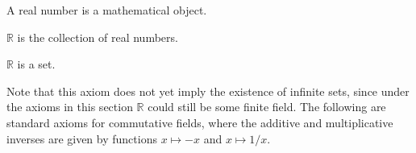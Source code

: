 \documentclass{article}
\begin{document}
\begin{forthel}

\begin{signature}
A real number is a mathematical object.
\end{signature}

\begin{definition}
$\mathbb{R}$ is the collection of real numbers.
\end{definition}

\begin{axiom}
$\mathbb{R}$ is a set.
\end{axiom}
\end{forthel}
%
Note that this axiom does not yet imply the existence of infinite sets,
since under the axioms in this section $\mathbb{R}$ could still be some finite 
field. The following are standard axioms for commutative fields, where the
additive and multiplicative inverses are given by functions 
$x \mapsto -x$ and $x \mapsto 1/x$. 
%
\end{document}
